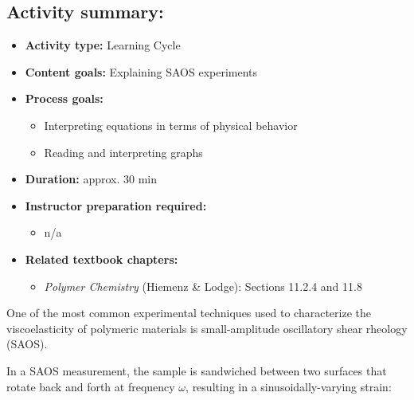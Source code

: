 \begin{activity}
\begin{instructornotes}
	\subsection*{Activity summary:}
	\begin{itemize}
		\item \textbf{Activity type:} Learning Cycle
		\item \textbf{Content goals:} Explaining SAOS experiments
		\item \textbf{Process goals:} %
			\begin{itemize}
				\item Interpreting equations in terms of physical behavior
				\item Reading and interpreting graphs
			\end{itemize}
		\item \textbf{Duration:} approx. 30 min
		\item \textbf{Instructor preparation required:} 
			\begin{itemize}
				\item n/a
			\end{itemize}
		\item \textbf{Related textbook chapters:}
			\begin{itemize}
				\item \emph{Polymer Chemistry} (Hiemenz \& Lodge): Sections 11.2.4 and 11.8
			\end{itemize}
	\end{itemize}

\end{instructornotes}



\begin{model}
\label{model:rheology}

	One of the most common experimental techniques used to characterize the viscoelasticity of polymeric materials is small-amplitude oscillatory shear rheology (SAOS).
	
	In a SAOS measurement, the sample is sandwiched between two surfaces that rotate back and forth at frequency $\omega$, resulting in a sinusoidally-varying strain:
	

\end{model}
\end{activity}
